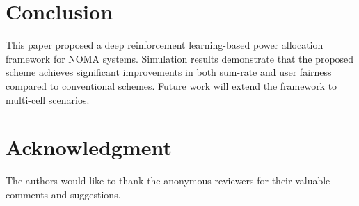\documentclass[journal]{IEEEtran}
\begin{document}

\section{Conclusion}
\label{sec:conclusion}

This paper proposed a deep reinforcement learning-based power allocation
framework for NOMA systems. Simulation results demonstrate that the proposed
scheme achieves significant improvements in both sum-rate and user fairness
compared to conventional schemes. Future work will extend the framework to
multi-cell scenarios.


\section*{Acknowledgment}
The authors would like to thank the anonymous reviewers for their valuable
comments and suggestions.





\end{document}
